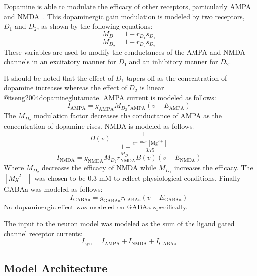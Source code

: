 \documentclass[twocolumn]{article}
\begin{document}
Dopamine is able to modulate the efficacy of other receptors, particularly AMPA and NMDA~\cite{hernandez2004modulation,higley2010competitive,tseng2004dopamineglutamate}.
This dopaminergic gain modulation is modeled by two receptors, $D_1$ and $D_2$, as shown by the following equations:
\begin{equation*}
    M_{D_1} = 1 - r_{D_1} s_{D_1}
\end{equation*}
\begin{equation*}
    M_{D_2} = 1 - r_{D_2} s_{D_2}
\end{equation*}
These variables are used to modify the conductances of the AMPA and NMDA channels in an excitatory manner for $D_1$ and an inhibitory manner for $D_2$. 

It should be noted that the effect of $D_1$ tapers off as the concentration of dopamine increases whereas the effect of $D_2$ is linear @tseng2004dopamineglutamate. 
AMPA current is modeled as follows:
\begin{equation*}
    I_{\mathrm{AMPA}} = g_{\mathrm{AMPA}} M_{D_2} r_{\mathrm{AMPA}} (v - E_{\mathrm{AMPA}})
\end{equation*}
The $M_{D_2}$ modulation factor decreases the conductance of AMPA as the concentration of dopamine rises. NMDA is modeled as follows:
\begin{equation*}
    B(v) = \frac{1}{1 + \frac{e ^ {-0.062 v} [{\mathrm{Mg}}^{2+}]}{3.75}}
\end{equation*}
\begin{equation*}
    I_{\mathrm{NMDA}} = g_{\mathrm{NMDA}} M_{D_2} r_{\mathrm{NMDA}} ^ {M_{D_1}} B(v) (v - E_{\mathrm{NMDA}})
\end{equation*}
Where $M_{D_2}$ decreases the efficacy of NMDA while $M_{D_1}$ increases the efficacy. The $[{Mg}^{2+}]$ was chosen to be 0.3 mM to reflect physiological conditions. Finally GABAa was modeled as follows:
\begin{equation*}
    I_{\mathrm{GABAa}} = g_{\mathrm{GABAa}} r_{\mathrm{GABAa}} (v - E_{\mathrm{GABAa}})
\end{equation*}
No dopaminergic effect was modeled on GABAa specifically. 

The input to the neuron model was modeled as the sum of the ligand gated channel receptor currents:
\begin{equation*}
    I_{\mathrm{syn}} = I_{\mathrm{AMPA}} + I_{\mathrm{NMDA}} + I_{\mathrm{GABAa}}
\end{equation*}

\subsection{Model Architecture}
\end{document}
